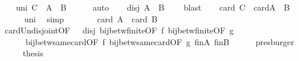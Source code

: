 \begin{isabellebody}
\ \ \isamarkupfalse%
\ uni{\isacharcolon}{\kern0pt}\ {\isachardoublequoteopen}{\isacharquery}{\kern0pt}C\ {\isacharequal}{\kern0pt}\ {\isacharquery}{\kern0pt}A{\isacharprime}{\kern0pt}\ {\isasymunion}\ {\isacharquery}{\kern0pt}B{\isacharprime}{\kern0pt}{\isachardoublequoteclose}\isanewline
\ \ \ \ \isamarkupfalse%
\ auto\isanewline
\ \ \isamarkupfalse%
\ disj{\isacharcolon}{\kern0pt}\ {\isachardoublequoteopen}{\isacharquery}{\kern0pt}A{\isacharprime}{\kern0pt}\ {\isasyminter}\ {\isacharquery}{\kern0pt}B{\isacharprime}{\kern0pt}\ {\isacharequal}{\kern0pt}\ {\isacharbraceleft}{\kern0pt}{\isacharbraceright}{\kern0pt}{\isachardoublequoteclose}\ \isamarkupfalse%
\ blast\isanewline
\ \ \isamarkupfalse%
\ {\isachardoublequoteopen}card\ {\isacharquery}{\kern0pt}C\ {\isacharequal}{\kern0pt}\ card{\isacharparenleft}{\kern0pt}{\isacharquery}{\kern0pt}A{\isacharprime}{\kern0pt}\ {\isasymunion}\ {\isacharquery}{\kern0pt}B{\isacharprime}{\kern0pt}{\isacharparenright}{\kern0pt}{\isachardoublequoteclose}\isanewline
\ \ \ \ \isamarkupfalse%
\ uni\ \isamarkupfalse%
\ simp\isanewline
\ \ \isamarkupfalse%
\ \isamarkupfalse%
\ {\isachardoublequoteopen}{\isasymdots}\ {\isacharequal}{\kern0pt}\ card\ {\isacharquery}{\kern0pt}A\ {\isacharplus}{\kern0pt}\ card\ {\isacharquery}{\kern0pt}B{\isachardoublequoteclose}\isanewline
\ \ \ \ \isamarkupfalse%
\ card{\isacharunderscore}{\kern0pt}Un{\isacharunderscore}{\kern0pt}disjoint{\isacharbrackleft}{\kern0pt}OF\ {\isacharunderscore}{\kern0pt}\ {\isacharunderscore}{\kern0pt}\ disj{\isacharbrackright}{\kern0pt}\ bij{\isacharunderscore}{\kern0pt}betw{\isacharunderscore}{\kern0pt}finite{\isacharbrackleft}{\kern0pt}OF\ f{\isacharbrackright}{\kern0pt}\ bij{\isacharunderscore}{\kern0pt}betw{\isacharunderscore}{\kern0pt}finite{\isacharbrackleft}{\kern0pt}OF\ g{\isacharbrackright}{\kern0pt}\isanewline
\ \ \ \ \ \ bij{\isacharunderscore}{\kern0pt}betw{\isacharunderscore}{\kern0pt}same{\isacharunderscore}{\kern0pt}card{\isacharbrackleft}{\kern0pt}OF\ f{\isacharbrackright}{\kern0pt}\ bij{\isacharunderscore}{\kern0pt}betw{\isacharunderscore}{\kern0pt}same{\isacharunderscore}{\kern0pt}card{\isacharbrackleft}{\kern0pt}OF\ g{\isacharbrackright}{\kern0pt}\ fin{\isacharunderscore}{\kern0pt}A\ fin{\isacharunderscore}{\kern0pt}B\isanewline
\ \ \ \ \isamarkupfalse%
\ presburger\isanewline
\ \ \isamarkupfalse%
\ \isamarkupfalse%
\ {\isacharquery}{\kern0pt}thesis\ \isacommand{{\isachardot}{\kern0pt}}\isamarkupfalse%

\end{isabellebody}

